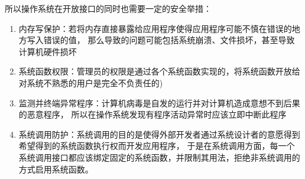 所以操作系统在开放接口的同时也需要一定的安全举措：
\begin{enumerate}
    \item 内存写保护：若将内存直接暴露给应用程序使得应用程序可能不慎在错误的地方写入错误的值，
    那么导致的问题可能包括系统崩溃、文件损坏，甚至导致计算机硬件损坏
    \item 系统函数权限：管理员的权限是通过各个系统函数实现的，将系统函数开放给对系统不熟悉的用户是完全不负责任的)
    \item 监测并终端异常程序：计算机病毒是自发的运行并对计算机造成意想不到后果的恶意程序，
    所以在操作系统发现有程序活动异常时应该立即中断此程序
    \item 系统调用防护：系统调用的目的是使得外部开发者通过系统设计者的意愿得到希望得到的系统函数执行权而开发应用程序，
    于是在系统调用方面，每一个系统调用接口都应该绑定固定的系统函数，并限制其用法，拒绝非系统调用的方式启用系统函数。
\end{enumerate}